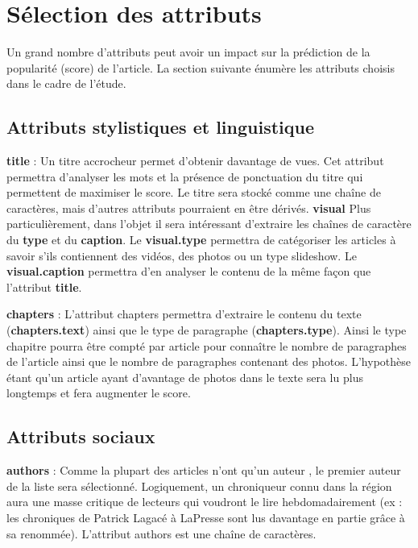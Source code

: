 \documentclass[french]{article}
\begin{document}
\section{Sélection des attributs}

Un grand nombre d'attributs peut avoir un impact sur la prédiction de la popularité (score) de l'article. La section suivante énumère les attributs choisis dans le cadre de l'étude.









\subsection{Attributs stylistiques et linguistique}
\textbf{title} : Un titre accrocheur permet d'obtenir davantage de vues. Cet attribut permettra d'analyser les mots et la présence de ponctuation du titre qui permettent de maximiser le score. Le titre sera stocké comme une chaîne de caractères, mais d'autres attributs pourraient en être dérivés.
\textbf{visual} Plus particulièrement, dans l'objet il sera intéressant d'extraire les chaînes de caractère du \textbf{type} et du \textbf{caption}. Le \textbf{visual.type} permettra de catégoriser les articles à savoir s'ils contiennent des vidéos, des photos ou un type slideshow. Le \textbf{visual.caption} permettra d'en analyser le contenu de la même façon que l'attribut \textbf{title}.

\textbf{chapters} : L'attribut chapters permettra d'extraire le contenu du texte (\textbf{chapters.text}) ainsi que le type de paragraphe (\textbf{chapters.type}). Ainsi le type chapitre pourra être compté par article pour connaître le nombre de paragraphes de l'article ainsi que le nombre de paragraphes contenant des photos. L'hypothèse étant qu'un article ayant d'avantage de photos dans le texte sera lu plus longtemps et fera augmenter le score.

\subsection{Attributs sociaux}

\textbf{authors} : Comme la plupart des articles n'ont qu'un auteur \cite{rapport12019}, le premier auteur de la liste sera sélectionné. Logiquement, un chroniqueur connu dans la région aura une masse critique de lecteurs qui voudront le lire hebdomadairement (ex : les chroniques de Patrick Lagacé à LaPresse sont lus davantage en partie grâce à sa renommée). L'attribut authors est une chaîne de caractères.
\end{document}
